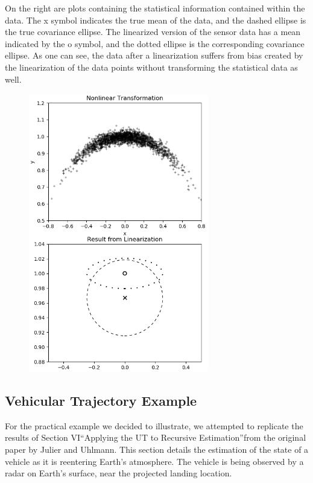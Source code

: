 \documentclass[]{article}
\begin{document}
On the right are plots containing the statistical information contained within the data. The x symbol indicates the true mean of the data, and the dashed ellipse is the true covariance ellipse. The linearized version of the sensor data has a mean indicated by the o symbol, and the dotted ellipse is the corresponding covariance ellipse. As one can see, the data after a linearization suffers from bias created by the linearization of the data points without transforming the statistical data as well.

\begin{figure}[ht!]
\centering\noindent
\includegraphics[width=0.7\textwidth]{fig_1.png}
\label{fig:cart_polar}
\end{figure}

\subsection{Vehicular Trajectory Example}
\label{sec:vehicle}

For the practical example we decided to illustrate, we attempted to replicate the results of Section VI\textemdash \textquotedblleft Applying the UT to Recursive Estimation\textquotedblright\textemdash from the original paper by Julier and Uhlmann\cite{b1}. This section details the estimation of the state of a vehicle as it is reentering Earth's atmosphere. The vehicle is being observed by a radar on Earth's surface, near the projected landing location.
\end{document}

